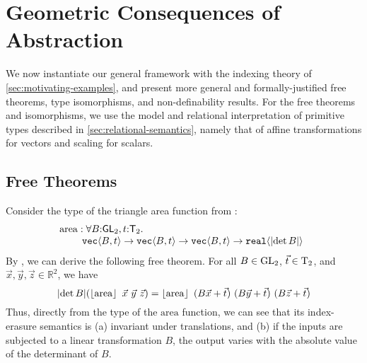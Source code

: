 \section{Geometric Consequences of Abstraction}
\label{sec:instantiations}
We now instantiate our general framework %
with
the indexing theory of \autoref{sec:motivating-examples}, and present
more general and formally-justified free theorems, type isomorphisms,
and non-definability results.  For the free theorems and isomorphisms,
we use the model and relational interpretation of primitive types
described in \autoref{sec:relational-semantics}, namely that of
affine transformations for vectors and scaling for scalars.


\subsection{Free Theorems}
\label{sec:theorems-for-free}

Consider the type of the triangle area %
function from
:
\begin{displaymath}
  \begin{array}{@{}l}
    \mathrm{area} : \forall B\mathord:\SynGL{2}, t\mathord:\SynTransl{2}.\ \\
    \hspace{0.8cm}\tyPrim{vec}{B, t} \to \tyPrim{vec}{B, t} \to \tyPrim{vec}{B, t} \to \tyPrim{real}{\abs{\det B}}
  \end{array}
\end{displaymath}
By , we can derive the following free theorem. For all $B \in \mathrm{GL}_2$, $\vec{t} \in \mathrm{T}_2$, and $\vec{x}, \vec{y}, \vec{z} \in \mathbb{R}^2$, we have 
\begin{displaymath}
  \abs{\det B}(\tmSem{\mathrm{area}}\ \vec{x}\ \vec{y}\ \vec{z}) = \tmSem{\mathrm{area}}\ (B\vec{x} + \vec{t})\ (B\vec{y} + \vec{t})\ (B\vec{z} + \vec{t})
\end{displaymath}
Thus, directly from the type of the $\mathrm{area}$ function, we can
see that its index-erasure semantics is (a) invariant under
translations, and (b) if the inputs are subjected to a linear
transformation $B$, the output varies with the absolute value of the
determinant of $B$.




